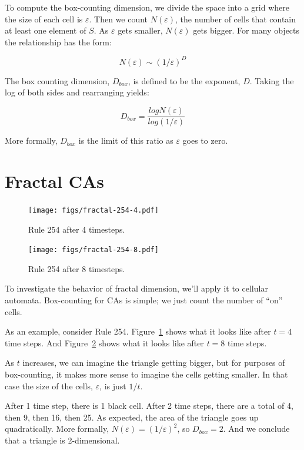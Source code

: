 \documentclass[10pt]{book}
\begin{document}
\newcommand{\veps}{\varepsilon}

To compute the box-counting dimension, we divide the space into a grid
where the size of each cell is $\veps$.  Then we count $N(\veps)$,
the number of cells that contain at least one element of $S$.  As
$\veps$ gets smaller, $N(\veps)$ gets bigger.  For many objects
the relationship has the form:

\[ N(\veps) \sim \left( 1 / \veps \right)^D \]

The box counting dimension, $D_{box}$, is defined to be the exponent, $D$.
Taking the log of both sides and rearranging yields:

\[ D_{box} = \frac{log N(\veps)}{log \left( 1 / \veps \right)} \]

More formally, $D_{box}$ is the limit of this ratio as $\veps$ goes
to zero.


\section{Fractal CAs}

\begin{figure}
\centerline{\texttt{[image: figs/fractal-254-4.pdf]}}
\caption{Rule 254 after 4 timesteps.\label{fig.rule254.1}}
\end{figure}

\begin{figure}
\centerline{\texttt{[image: figs/fractal-254-8.pdf]}}
\caption{Rule 254 after 8 timesteps.\label{fig.rule254.2}}
\end{figure}

To investigate the behavior of fractal dimension, we'll apply it
to cellular automata.  Box-counting for CAs is simple; we
just count the number of ``on'' cells.

As an example, consider Rule 254.  Figure~\ref{fig.rule254.1} shows
what it looks like after $t=4$ time steps.  And
Figure~\ref{fig.rule254.2} shows what it looks like after $t=8$ time
steps.  

As $t$ increases, we can imagine the triangle getting bigger,
but for purposes of box-counting, it makes more sense to imagine
the cells getting smaller.  In that case the size of the cells,
$\veps$, is just $1/t$.

After 1 time step, there is 1 black cell.  After 2 time steps, there
are a total of 4, then 9, then 16, then 25.  As expected, the area
of the triangle goes up quadratically.  More formally,
$N(\veps) = \left( 1 / \veps \right)^2$, so $D_{box} = 2$.  And we conclude
that a triangle is 2-dimensional.
\end{document}
